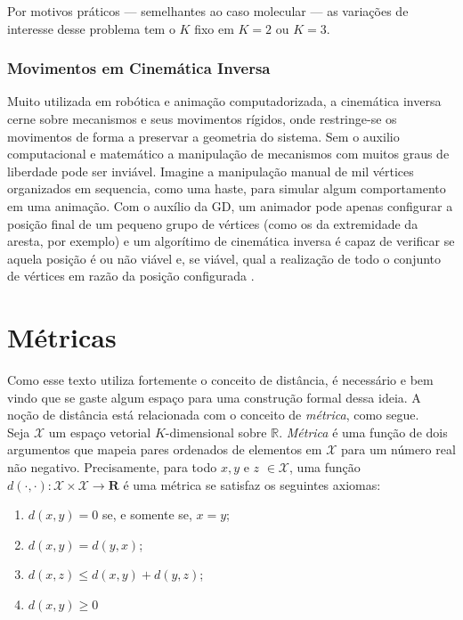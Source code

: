 \documentclass[a4paper,12pt]{article}
\begin{document}
Por motivos práticos --- semelhantes ao caso molecular --- as variações de interesse desse problema tem o $K$ fixo em $K= 2$ ou $K=3$.

\subsubsection{Movimentos em Cinemática Inversa}

Muito utilizada em robótica e animação computadorizada, a cinemática inversa cerne sobre mecanismos e seus movimentos rígidos, onde restringe-se os movimentos de forma a preservar a geometria do sistema. Sem o auxilio computacional e matemático a manipulação de mecanismos com muitos graus de liberdade  pode ser inviável. Imagine a manipulação manual de mil vértices organizados em sequencia, como uma haste, para simular algum comportamento em uma animação. Com o auxílio da GD, um animador pode apenas configurar a posição final de um pequeno grupo de vértices (como os da extremidade da aresta, por exemplo) e um algorítimo de cinemática inversa é capaz de verificar se aquela posição é ou não viável e, se viável, qual a realização de todo o conjunto de vértices em razão da posição configurada \cite{cinematicaInversa}.

\newpage
{}
{}




\appendix
\newpage
\section{Métricas}
\label{ap:metric}

Como esse texto utiliza fortemente o conceito de distância, é necessário e bem vindo que se gaste algum espaço para uma construção formal dessa ideia. A noção de distância está relacionada com o conceito de \textit{métrica}, como segue.
\\

Seja $\mathcal{X}$ um espaço vetorial $K$-dimensional sobre $\mathbb{R}$. \textit{Métrica} é uma função de dois argumentos que mapeia pares ordenados de elementos em $\mathcal{X}$ para um número real não negativo. Precisamente, para todo $x, y$ e $z$ $\in \mathcal{X}$, uma função $d(\cdot,\cdot): \mathcal{X} \times \mathcal{X} \longrightarrow \mathbf{R}$ é uma métrica se satisfaz os seguintes axiomas:

\begin{enumerate}
	\item $d(x,y) = 0$ se, e somente se, $x = y$; 
	\item $d(x,y) = d(y,x)$;
	\item $d(x,z) \leq d(x,y) + d(y,z)$;
	\item $d(x,y) \geq 0$
\end{enumerate}
\end{document}
